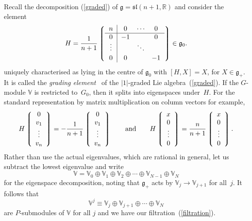 \documentclass[11pt]{article}
\begin{document}
Recall the decomposition (\ref{graded}) of
${\mathfrak{g}}={\mathfrak{sl}}(n+1,{\mathbb{R}})$ and consider the element
\[H=\frac{1}{n+1}
\left\lgroup\begin{tabular}{c|ccc}$n$&$0$&$\!\cdots\!$&$0$\\ \hline
$0$&$-1$&&$0$\\
\raisebox{2pt}[15pt]{$\vdots$}&&
\raisebox{1pt}[0pt][0pt]{\makebox[0pt]{\Large$\ddots$}}\\
$0$&$0$&&$-1$\end{tabular}\right\rgroup\in{\mathfrak{g}}_0.\]
uniquely characterised as lying in the centre of ${\mathfrak{g}}_0$ with
$[H,X]=X$, for $X\in{\mathfrak{g}}_+$. It is called the {\em grading
element\/}~\cite{thebook} of the $|1|$-graded Lie algebra~(\ref{graded}). If
the $G$-module ${\mathbb{V}}$ is restricted to~$G_0$, then it splits into
eigenspaces under~$H$. For the standard representation by matrix multiplication
on column vectors for example,
\begin{equation}\label{Hstandard}
H\left\lgroup\begin{array}{c}0\\ v_1\\ \vdots\\ v_n\end{array}\right\rgroup=
-\frac{1}{n+1}
\left\lgroup\begin{array}{c}0\\ v_1\\ \vdots\\ v_n\end{array}\right\rgroup
\qquad\mbox{and}\qquad
H\left\lgroup\begin{array}{c}x\\ 0\\ \vdots\\ 0\end{array}\right\rgroup=
\frac{n}{n+1}
\left\lgroup\begin{array}{c}x\\ 0\\ \vdots\\ 0\end{array}\right\rgroup.
\end{equation}
Rather than use the actual eigenvalues, which are rational in general, let us
subtract the lowest eigenvalue and write
\begin{equation}\label{splits}
{\mathbb{V}}={\mathbb{V}}_0\oplus{\mathbb{V}}_1\oplus{\mathbb{V}}_2
\oplus\cdots\oplus{\mathbb{V}}_{N-1}\oplus{\mathbb{V}}_N\end{equation}
for the eigenspace decomposition, noting that ${\mathfrak{g}}_+$ acts by
${\mathbb{V}}_j\to{\mathbb{V}}_{j+1}$ for all~$j$. It follows that
\begin{equation}\label{submodules}
{\mathbb{V}}^j\equiv{\mathbb{V}}_j\oplus{\mathbb{V}}_{j+1}\oplus\cdots\oplus
{\mathbb{V}}_N\end{equation}
are $P$-submodules of ${\mathbb{V}}$ for all $j$ and we have our
f\/iltration~(\ref{filtration}).
\end{document}
